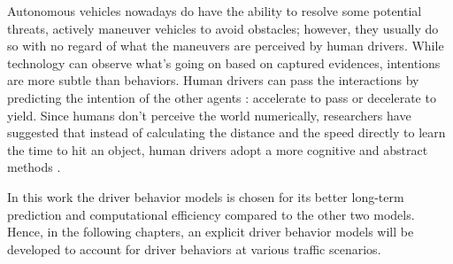Autonomous vehicles nowadays do have the ability to resolve some potential threats, actively maneuver vehicles to avoid obstacles; however, they usually do so with no regard of what the maneuvers are perceived by human drivers. While technology can observe what's going on based on captured evidences, intentions are more subtle than behaviors. Human drivers can pass the interactions by predicting the intention of the other agents : accelerate to pass or decelerate to yield. Since humans don't perceive the world numerically, researchers have suggested that instead of calculating the distance and the speed directly to learn the time to hit an object, human drivers adopt a more cognitive and abstract methods \cite{cog}.

In this work the driver behavior models is chosen for its better long-term prediction and computational efficiency compared to the other two models.  Hence, in the following chapters, an explicit driver behavior models will be developed to account for driver behaviors at various traffic scenarios.


